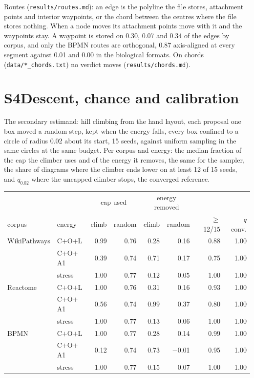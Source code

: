 \documentclass[11pt]{article}
\begin{document}
Routes (\texttt{results/routes.md}): an edge is the polyline the file stores, attachment
points and interior waypoints, or the chord between the centres where the file stores nothing. When a node moves its
attachment points move with it and the waypoints stay. A
waypoint is stored on 0.30, 0.07 and 0.34 of the edges by corpus, and only the BPMN
routes are orthogonal, 0.87 axis-aligned at every segment against 0.01 and 0.00 in the
biological formats. On chords (\texttt{data/*\_chords.txt}) no verdict moves
(\texttt{results/chords.md}).

\section*{S4\quad Descent, chance and calibration}

The secondary estimand: hill climbing from the hand layout, each proposal one box moved a
random step, kept when the energy falls, every box confined to a circle of radius 0.02
about its start, 15 seeds, against uniform sampling in the same circles at the same
budget. Per corpus and energy: the median fraction of the cap the climber uses and of the
energy it removes, the same for the sampler, the share of diagrams where the climber ends
lower on at least 12 of 15 seeds, and $q_{0.02}$ where the uncapped climber stops, the
converged reference.

\begin{center}\footnotesize
\begin{tabular}{llrrrrrr}
\toprule
 & & \multicolumn{2}{c}{cap used} & \multicolumn{2}{c}{energy removed} & & \\
corpus & energy & climb & random & climb & random & $\ge$12/15 & $q$ conv. \\
\midrule
WikiPathways & C$+$O$+$L & 0.99 & 0.76 & 0.28 & 0.16 & 0.88 & 1.00 \\
 & C$+$O$+$A1 & 0.39 & 0.74 & 0.71 & 0.17 & 0.75 & 1.00 \\
 & stress & 1.00 & 0.77 & 0.12 & 0.05 & 1.00 & 1.00 \\
\midrule
Reactome & C$+$O$+$L & 1.00 & 0.76 & 0.31 & 0.16 & 0.93 & 1.00 \\
 & C$+$O$+$A1 & 0.56 & 0.74 & 0.99 & 0.37 & 0.80 & 1.00 \\
 & stress & 1.00 & 0.77 & 0.13 & 0.06 & 1.00 & 1.00 \\
\midrule
BPMN & C$+$O$+$L & 1.00 & 0.77 & 0.28 & 0.14 & 0.99 & 1.00 \\
 & C$+$O$+$A1 & 0.12 & 0.74 & 0.73 & $-$0.01 & 0.95 & 1.00 \\
 & stress & 1.00 & 0.77 & 0.15 & 0.07 & 1.00 & 1.00 \\
\bottomrule
\end{tabular}
\end{center}
\end{document}
